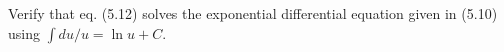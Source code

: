Verify that eq. (5.12) solves the exponential differential equation given in (5.10) using $\int du/u = \ln u + C$.

